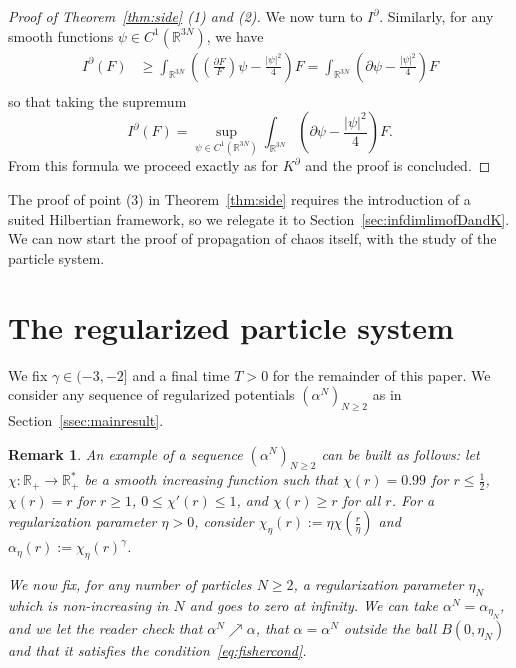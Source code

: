 \documentclass[11pt,a4paper]{article}
\theoremstyle{definition}
\theoremstyle{plain}
\newtheorem{remark}[defi]{Remark}
\begin{document}
\begin{proof}[Proof of Theorem~\ref{thm:side} (1) and (2)]
    We now turn to $I^\partial$. Similarly, for any smooth functions $\psi \in C^1(\mathbb{R}^{3N})$, we have
    \begin{align*}
       I^\partial(F) &\geq \int_{\mathbb{R}^{3N}}\left(\left( \frac{\partial F}{F} \right) \psi -\frac{\vert \psi\vert^2}{4}\right)F=\int_{\mathbb{R}^{3N}}   \left(\partial\psi -\frac{\vert \psi\vert^2}{4}\right)F\\
    \end{align*}
    so that taking the supremum
    $$I^\partial(F)=\sup_{\psi \in C^1(\mathbb{R}^{3N})}\int_{\mathbb{R}^{3N}}   \left(\partial\psi -\frac{\vert \psi\vert^2}{4}\right)F.$$
    From this formula we proceed exactly as for $K^\partial$ and the proof is concluded. 
\end{proof}
The proof of point (3) in Theorem~\ref{thm:side} requires the introduction of a suited Hilbertian framework, so we relegate it to Section~\ref{sec:infdimlimofDandK}. We can now start the proof of propagation of chaos itself, with the study of the particle system.

\section{The regularized particle system}
\label{sec:regularized particle system}

We fix $\gamma \in (-3,-2]$ and a final time $T>0$ for the remainder of this paper. We consider any sequence of regularized potentials $(\alpha^N)_{N\geq 2}$ as in Section~\ref{ssec:mainresult}. 

\begin{remark}
\label{rem:regularizedpotential}
An example of a sequence $(\alpha^N)_{N\geq 2}$ can be built as follows:
let $\chi:\mathbb{R_+}\rightarrow\mathbb{R^*_+}$ be a smooth increasing function such that $\chi(r)=0.99$ for $r\leq \frac{1}{2}$, $\chi(r)=r$ for $r\geq 1$, $0\leq \chi'(r)\leq 1$, and $\chi(r)\geq r$ for all $r$. For a regularization parameter $\eta>0$, consider $\chi_\eta(r):=\eta\chi(\frac{r}{\eta})$ and $\alpha_\eta(r):=\chi_\eta (r)^\gamma$.

We now fix, for any number of particles $N\geq 2$, a regularization parameter $\eta_N$ which is non-increasing in $N$ and goes to zero at infinity. We can take $\alpha^N=\alpha_{\eta_N}$, and we let the reader check that $\alpha^N \nearrow \alpha$, that $\alpha=\alpha^N$ outside the ball $B(0,\eta_N)$ and that it satisfies the condition~\eqref{eq:fishercond}.
\end{remark}
\end{document}
